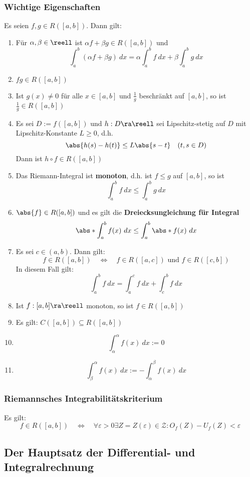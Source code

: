 \documentclass{kit}
\begin{document}
    \subsubsection{Wichtige Eigenschaften}
      Es seien $f,g\in R([a,b])$. Dann gilt:
      \begin{enumerate}
        \item Für $\alpha,\beta\in\reell$ ist $\alpha f+\beta g\in R([a,b])$ und
          $$\int^b_a(\alpha f+\beta g)\ dx=\alpha\int^b_af\ dx+\beta\int^b_ag\ dx$$
        \item $fg\in R([a,b])$
        \item Ist $g(x)\neq0$ für alle $x\in[a,b]$ und $\frac{1}{g}$ beschränkt auf $[a,b]$, so ist $\frac{1}{g}\in R([a,b])$
        \item Es sei $D:=f([a,b])$ und $h:D\ra\reell$ sei Lipschitz-stetig auf $D$ mit Lipschitz-Konstante $L\ge0$, d.h.
          $$\abs{h(s)-h(t)}\le L\abs{s-t}\quad(t,s\in D)$$
          Dann ist $h\circ f\in R([a,b])$
        \item Das Riemann-Integral ist \textbf{monoton}, d.h. ist $f\le g$ auf $[a,b]$, so ist
          $$\int^b_af\ dx\le\int^b_ag\ dx$$
        \item $\abs{f}\in R([a,b])$ und es gilt die \textbf{Dreiecksungleichung für Integral}
          $$\abs*{\int^b_af(x)\ dx}\le\int^b_a\abs*{f(x)}\ dx$$
        \item Es sei $c\in(a,b)$. Dann gilt:
          $$f\in R([a,b])\quad\Longleftrightarrow\quad f\in R([a,c])\text{ und }f\in R([c,b])$$
          In diesem Fall gilt:
          $$\int^b_af\ dx=\int^c_af\ dx+\int^b_cf\ dx$$
        \item Ist $f:[a,b]\ra\reell$ monoton, so ist $f\in R([a,b])$
        \item Es gilt: $C([a,b])\subseteq R([a,b])$
        \item $$\int^\alpha_\alpha f(x)\ dx:=0$$
        \item $$\int^\alpha_\beta f(x)\ dx:=-\int^\beta_\alpha f(x)\ dx$$
      \end{enumerate}
    \subsubsection{Riemannsches Integrabilitätskriterium}
      Es gilt:
      $$f\in R([a,b])\quad\Longleftrightarrow\quad\forall\varepsilon>0\exists Z=Z(\varepsilon)\in\mathcal{Z}:O_f(Z)-U_f(Z)<\varepsilon$$
  \subsection{Der Hauptsatz der Differential- und Integralrechnung}
\end{document}
